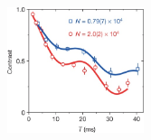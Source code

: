 \documentclass{beamer}
\begin{document}
\begin{frame}{}
\end{frame}

\begin{frame}{}
\end{frame}

\begin{frame}{}
  \hypertarget<1>{backup-many-body-echo}{}
  \begin{center}
    \hyperlink{applications-many-body}{\includegraphics[width=4cm]{imgs/many-body-oscillation.png}}\\
  \end{center}
\end{frame}

\begin{frame}{}
\end{frame}

\newcommand\drawLevels[1]{
  \draw[line width=1] (#1-0.6, 4.5) -- (#1+0.6, 4.5);
  \draw[line width=1] (#1-0.6, 0) -- (#1+0.6, 0);
  \draw[line width=1] (#1-0.6, -1) -- (#1+0.6, -1);
}
\end{document}
